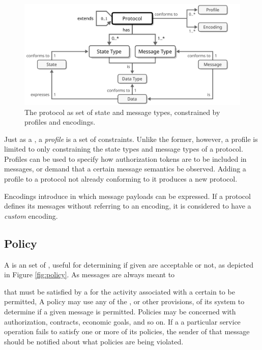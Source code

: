 \begin{figure}[ht!]
  \centering
  \includegraphics[scale=0.9]{figures/protocol}
  \caption{
    The protocol as set of state and message types, constrained by profiles and encodings.
  }
  \label{fig:protocol}
\end{figure}

Just as a , a \textit{profile} is a set of constraints.
Unlike the former, however, a profile is limited to only constraining the state types and message types of a protocol.
Profiles can be used to specify how authorization tokens are to be included in messages, or demand that a certain message semantics be observed.
Adding a profile to a protocol not already conforming to it produces a new protocol.

Encodings introduce  in which message payloads can be expressed.
If a protocol defines its messages without referring to an encoding, it is considered to have a \textit{custom} encoding.

\subsection{Policy}
\label{sec:concepts:policy}

A  is an  set of , useful for determining if given  are acceptable or not, as depicted in Figure \ref{fig:policy}.
As messages are always meant to 

that must be satisfied by a  for the activity associated with a certain  to be permitted, 
A policy may use any of the , or other provisions, of its system to determine if a given message is permitted.
Policies may be concerned with authorization, contracts, economic goals, and so on.
If a   a particular service operation fails to satisfy one or more of its policies, the sender of that message should be notified about what policies are being violated.

